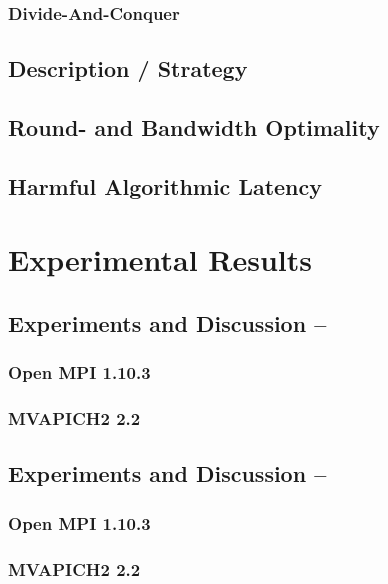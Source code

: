 \subsubsection{Divide-And-Conquer}

\subsection{Description / Strategy}

\subsection{Round- and Bandwidth Optimality}

\subsection{Harmful Algorithmic Latency}

\section{Experimental Results}

\subsection{Experiments and Discussion -- \mygather}

\subsubsection{Open MPI 1.10.3}

\subsubsection{MVAPICH2 2.2}

\subsection{Experiments and Discussion -- \myscatter}

\subsubsection{Open MPI 1.10.3}

\subsubsection{MVAPICH2 2.2}